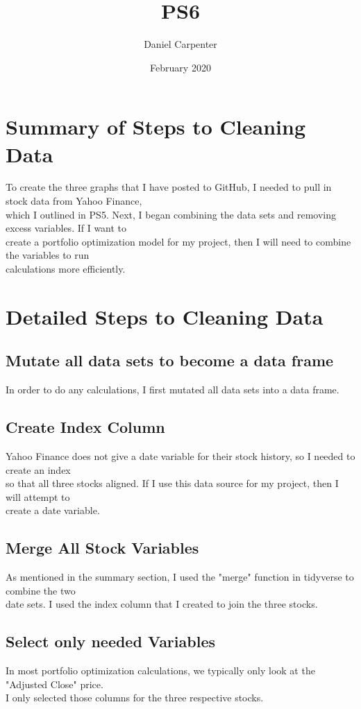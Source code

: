 \documentclass{article}
\title{PS6}
\author{Daniel Carpenter}
\date{February 2020}
\begin{document}
\maketitle

\section{Summary of Steps to Cleaning Data}
    To create the three graphs that I have posted to GitHub, I needed to pull in stock data from Yahoo Finance, \\
    which I outlined in PS5. Next, I began combining the data sets and removing excess variables. If I want to \\
    create a portfolio optimization model for my project, then I will need to combine the variables to run \\
    calculations more efficiently.
    
\section{Detailed Steps to Cleaning Data}
    \subsection{Mutate all data sets to become a data frame}
        In order to do any calculations, I first mutated all data sets into a data frame.
        
    \subsection{Create Index Column}
        Yahoo Finance does not give a date variable for their stock history, so I needed to create an index \\
        so that all three stocks aligned. If I use this data source for my project, then I will attempt to \\
        create a date variable.
        
    \subsection{Merge All Stock Variables}
        As mentioned in the summary section, I used the "merge" function in tidyverse to combine the two \\
        date sets. I used the index column that I created to join the three stocks. 
        
    \subsection{Select only needed Variables}
        In most portfolio optimization calculations, we typically only look at the "Adjusted Close" price. \\
        I only selected those columns for the three respective stocks.
        
\end{document}
